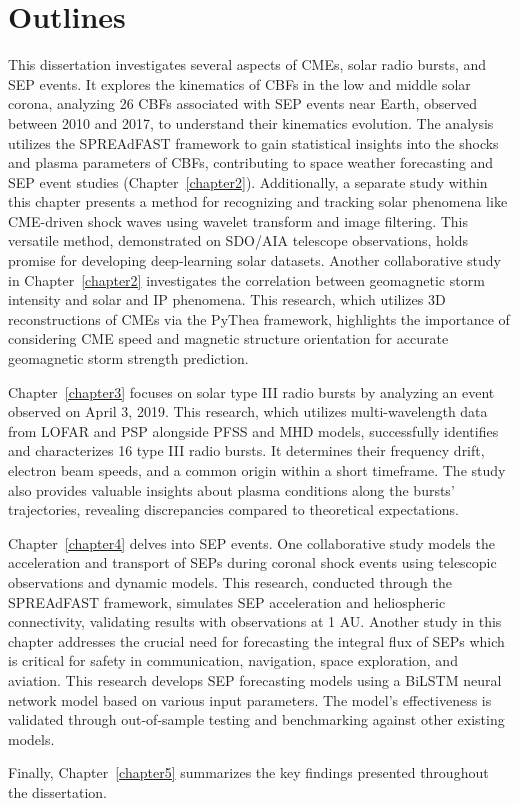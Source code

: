 \section{Outlines}
This dissertation investigates several aspects of CMEs, solar radio bursts, and SEP events. It explores the kinematics of CBFs in the low and middle solar corona, analyzing 26 CBFs associated with SEP events near Earth, observed between 2010 and 2017, to understand their kinematics evolution. The analysis utilizes the SPREAdFAST framework to gain statistical insights into the shocks and plasma parameters of CBFs, contributing to space weather forecasting and SEP event studies (Chapter~\ref{chapter2}). Additionally, a separate study within this chapter presents a method for recognizing and tracking solar phenomena like CME-driven shock waves using wavelet transform and image filtering. This versatile method, demonstrated on SDO/AIA telescope observations, holds promise for developing deep-learning solar datasets. Another collaborative study in Chapter~\ref{chapter2} investigates the correlation between geomagnetic storm intensity and solar and IP phenomena. This research, which utilizes 3D reconstructions of CMEs via the PyThea framework, highlights the importance of considering CME speed and magnetic structure orientation for accurate geomagnetic storm strength prediction.

Chapter~\ref{chapter3} focuses on solar type III radio bursts by analyzing an event observed on April 3, 2019. This research, which utilizes multi-wavelength data from LOFAR and PSP alongside PFSS and MHD models, successfully identifies and characterizes 16 type III radio bursts. It determines their frequency drift, electron beam speeds, and a common origin within a short timeframe. The study also provides valuable insights about plasma conditions along the bursts' trajectories, revealing discrepancies compared to theoretical expectations.

Chapter~\ref{chapter4} delves into SEP events. One collaborative study models the acceleration and transport of SEPs during coronal shock events using telescopic observations and dynamic models. This research, conducted through the SPREAdFAST framework, simulates SEP acceleration and heliospheric connectivity, validating results with observations at 1 AU. Another study in this chapter addresses the crucial need for forecasting the integral flux of SEPs which is critical for safety in communication, navigation, space exploration, and aviation. This research develops SEP forecasting models using a BiLSTM neural network model based on various input parameters. The model's effectiveness is validated through out-of-sample testing and benchmarking against other existing models.

Finally, Chapter~\ref{chapter5} summarizes the key findings presented throughout the dissertation.

